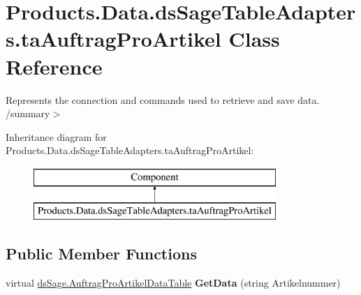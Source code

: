 \hypertarget{class_products_1_1_data_1_1ds_sage_table_adapters_1_1ta_auftrag_pro_artikel}{}\section{Products.\+Data.\+ds\+Sage\+Table\+Adapters.\+ta\+Auftrag\+Pro\+Artikel Class Reference}
\label{class_products_1_1_data_1_1ds_sage_table_adapters_1_1ta_auftrag_pro_artikel}


Represents the connection and commands used to retrieve and save data. /summary$>$  


Inheritance diagram for Products.\+Data.\+ds\+Sage\+Table\+Adapters.\+ta\+Auftrag\+Pro\+Artikel\+:\begin{figure}[H]
\begin{center}
\leavevmode
\includegraphics[height=2.000000cm]{class_products_1_1_data_1_1ds_sage_table_adapters_1_1ta_auftrag_pro_artikel}
\end{center}
\end{figure}
\subsection*{Public Member Functions}
\begin{DoxyCompactItemize}
\item 
virtual \hyperlink{class_products_1_1_data_1_1ds_sage_1_1_auftrag_pro_artikel_data_table}{ds\+Sage.\+Auftrag\+Pro\+Artikel\+Data\+Table} {\bfseries Get\+Data} (string Artikelnummer)\hypertarget{class_products_1_1_data_1_1ds_sage_table_adapters_1_1ta_auftrag_pro_artikel_aa370e5405af1b3f64657a203af2b2599}{}\label{class_products_1_1_data_1_1ds_sage_table_adapters_1_1ta_auftrag_pro_artikel_aa370e5405af1b3f64657a203af2b2599}

\end{DoxyCompactItemize}
